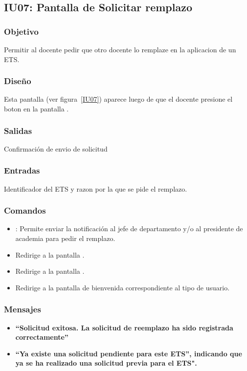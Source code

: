\subsection{IU07: Pantalla de Solicitar remplazo}

\subsubsection{Objetivo}
Permitir al docente pedir que otro docente lo remplaze en la aplicacion de un ETS.

\subsubsection{Diseño}
Esta pantalla  (ver figura~\ref{IU07}) aparece luego de que el docente presione el boton  en la pantalla .


\subsubsection{Salidas}
Confirmación de envio de solicitud

\subsubsection{Entradas}
Identificador del ETS y razon por la que se pide el remplazo.

\subsubsection{Comandos}
\begin{itemize}
	\item {}: Permite enviar la notificación al jefe de departamento y/o al presidente de academia para pedir el remplazo.
	\item {} Redirige a la pantalla .
    \item {} Redirige a la pantalla .
    \item {} Redirige a la pantalla de bienvenida correspondiente al tipo de usuario.
\end{itemize}

\subsubsection{Mensajes}

\begin{itemize}
	\item \textbf{ ``Solicitud exitosa. La solicitud de reemplazo ha sido registrada correctamente''}
	\item \textbf{ ``Ya existe una solicitud pendiente para este ETS'', indicando que ya se ha realizado una solicitud previa para el ETS".}
\end{itemize}

